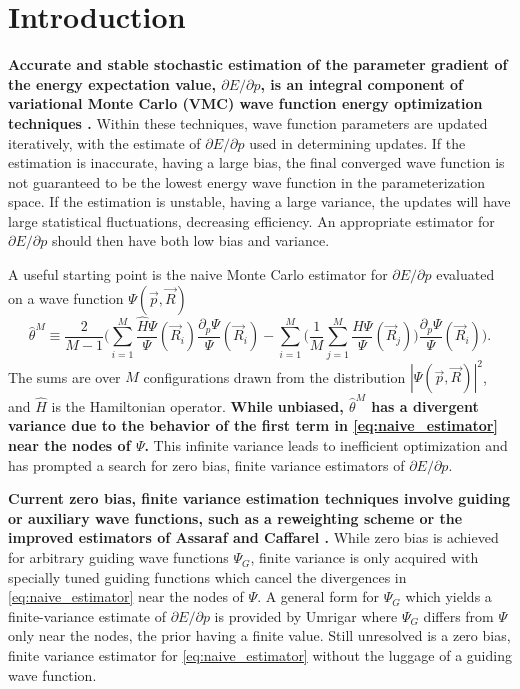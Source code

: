 \documentclass{article}
\begin{document}
\section{Introduction}
\textbf{Accurate and stable stochastic estimation of the parameter gradient of the energy expectation value, $\partial E/\partial p$, is an integral component of variational Monte Carlo (VMC) wave function energy optimization techniques \cite{PhysRevB.64.024512, doi:10.1063/1.1604379, Toulouse2007}.}
Within these techniques, wave function parameters are updated iteratively, with the estimate of $\partial E/\partial p$ used in determining updates.
If the estimation is inaccurate, having a large bias, the final converged wave function is not guaranteed to be the lowest energy wave function in the parameterization space.
If the estimation is unstable, having a large variance, the updates will have large statistical fluctuations, decreasing efficiency.
An appropriate estimator for $\partial E/ \partial p$ should then have both low bias and variance.

A useful starting point is the naive Monte Carlo estimator for $\partial E/\partial p$ evaluated on a wave function $\Psi(\vec{p}, \vec{R})$ 
\begin{equation}
\hat{\theta}^M \equiv \frac{2}{M-1}\Bigg(\sum_{i=1}^M \frac{\hat{H}\Psi}{\Psi}(\vec{R}_i) \frac{\partial_p \Psi}{\Psi}(\vec{R}_i) - \sum_{i=1}^M \Big(\frac{1}{M} \sum_{j=1}^M \frac{\hat{H}\Psi}{\Psi}(\vec{R}_j)\Big)\frac{\partial_p \Psi}{\Psi}(\vec{R}_i) \Bigg). \label{eq:naive_estimator}
\end{equation}
The sums are over $M$ configurations drawn from the distribution $|\Psi(\vec{p}, \vec{R})|^2$, and $\hat{H}$ is the Hamiltonian operator.
\textbf{While unbiased, $\hat{\theta}^M$ has a divergent variance \cite{Avella} due to the behavior of the first term in \eqref{eq:naive_estimator} near the nodes of $\Psi$.}
This infinite variance leads to inefficient optimization and has prompted a search for zero bias, finite variance estimators of $\partial E/\partial p$.

\textbf{Current zero bias, finite variance estimation techniques involve guiding or auxiliary wave functions, such as a reweighting scheme \cite{Avella, Attaccalite2008} or the improved estimators of Assaraf and Caffarel \cite{doi:10.1063/1.1286598, Assaraf2003}.}
While zero bias is achieved for arbitrary guiding wave functions $\Psi_G$, finite variance is only acquired with specially tuned guiding functions which cancel the divergences in \eqref{eq:naive_estimator} near the nodes of $\Psi$.
A general form for $\Psi_G$ which yields a finite-variance estimate of $\partial E/\partial p$ is provided by Umrigar \cite{doi:10.1063/1.4933112} where $\Psi_G$ differs from $\Psi$ only near the nodes, the prior having a finite value.
Still unresolved is a zero bias, finite variance estimator for \eqref{eq:naive_estimator} without the luggage of a guiding wave function. 
\end{document}
